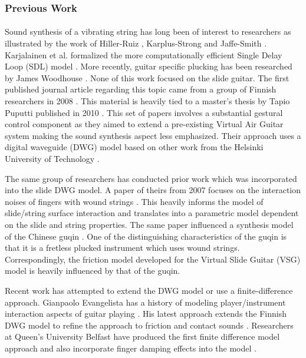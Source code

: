 \documentclass[12pt]{article}
\begin{document}
\subsubsection*{Previous Work}
\paragraph{}
Sound synthesis of a vibrating string has long been of interest to researchers as illustrated by the work of Hiller-Ruiz \cite{hiller_synthesizing_1971}, Karplus-Strong \cite{karplus_digital_1983} and Jaffe-Smith \cite{jaffe_extensions_1983}. Karjalainen et al. formalized the more computationally efficient Single Delay Loop (SDL) model \cite{karjalainen_plucked-string_1998}. More recently, guitar specific plucking has been researched by James Woodhouse \cite{woodhouse_synthesis_2004}. None of this work focused on the slide guitar. The first published journal article regarding this topic came from a group of Finnish researchers in 2008 \cite{pakarinen_virtual_2008}. This material is heavily tied to a master’s thesis by Tapio Puputti published in 2010 \cite{puputti_real-time_2012}. This set of papers involves a substantial gestural control component as they aimed to extend a pre-existing Virtual Air Guitar system making the sound synthesis aspect less emphasized. Their approach uses a digital waveguide (DWG) model based on other work from the Helsinki University of Technology \cite{valimaki_development_1998} \cite{karjalainen_plucked-string_1998}.

The same group of researchers has conducted prior work which was incorporated into the slide DWG model. A paper of theirs from 2007 focuses on the interaction noises of fingers with wound strings \cite{pakarinen_analysis_2007}. This heavily informs the model of slide/string surface interaction and translates into a parametric model dependent on the slide and string properties. The same paper influenced a synthesis model of the Chinese guqin \cite{penttinen_model-based_2006}. One of the distinguishing characteristics of the guqin is that it is a fretless plucked instrument which uses wound strings. Correspondingly, the friction model developed for the Virtual Slide Guitar (VSG) model is heavily influenced by that of the guqin.

Recent work has attempted to extend the DWG model or use a finite-difference approach. Gianpaolo Evangelista has a history of modeling player/instrument interaction aspects of guitar playing \cite{evangelista_physical_2011} \cite{evangelista_playerinstrument_2010}. His latest approach extends the Finnish DWG model to refine the approach to friction and contact sounds \cite{evangelista_physical_2012}. Researchers at Queen’s University Belfast have produced the first finite difference model approach and also incorporate finger damping effects into the model \cite{bhanuprakash_finite_2020}.
\end{document}
